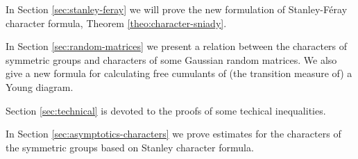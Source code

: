 \documentclass[12pt]{amsart}
\theoremstyle{plain}
\theoremstyle{remark}
\begin{document}
In Section \ref{sec:stanley-feray} we will prove the new formulation of
Stanley-F\'eray character formula, Theorem
\ref{theo:character-sniady}.

In Section \ref{sec:random-matrices} we present a relation between the 
characters of symmetric groups and characters of some Gaussian random matrices.
We also give a new formula for calculating free cumulants of (the transition
measure of) a Young diagram. 

Section \ref{sec:technical} is devoted to the proofs of some techical
inequalities.



In Section \ref{sec:asymptotics-characters}
we prove estimates for the characters of the symmetric groups based on
Stanley character formula.



% 
\end{document}
